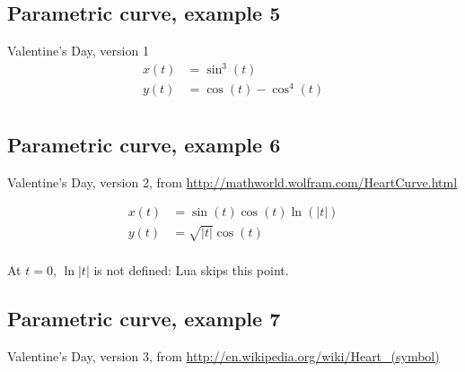 \newpage
\subsection{Parametric curve, example 5}
Valentine's Day, version 1
\begin{align*}
x(t) &=\sin^3(t)\\
y(t) &=\cos(t)-\cos^4(t)\\
\end{align*}

\begin{center}
\begin{tkzexample}[vbox]
\end{tkzexample}
\end{center}

\newpage
\subsection{Parametric curve, example 6}
Valentine's Day, version 2, from  \url{http://mathworld.wolfram.com/HeartCurve.html}

\begin{align*}
x(t) &=\sin(t)\cos(t)\ln(\lvert t\rvert)\\
y(t) &=\sqrt{\lvert t\rvert}\cos(t)\\
\end{align*}

\begin{center}
\begin{tkzexample}[vbox]
\end{tkzexample}
\end{center}

\tkzHand At $t=0$, $\ln\lvert t\rvert$ is not defined: Lua skips this point.

\newpage
\subsection{Parametric curve, example 7}
Valentine's Day, version 3, from  \url{http://en.wikipedia.org/wiki/Heart_(symbol)}

